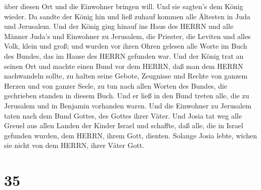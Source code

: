 über diesen Ort und die Einwohner bringen will. Und sie sagten's dem
König wieder.  Da sandte der König hin und ließ zuhauf
kommen alle Ältesten in Juda und Jerusalem.  Und der König
ging hinauf ins Haus des HERRN und alle Männer Juda's und Einwohner zu
Jerusalem, die Priester, die Leviten und alles Volk, klein und groß; und
wurden vor ihren Ohren gelesen alle Worte im Buch des Bundes, das im
Hause des HERRN gefunden war.  Und der König trat an seinen
Ort und machte einen Bund vor dem HERRN, daß man dem HERRN nachwandeln
sollte, zu halten seine Gebote, Zeugnisse und Rechte von ganzem Herzen
und von ganzer Seele, zu tun nach allen Worten des Bundes, die
gechrieben standen in diesem Buch.  Und er ließ in den Bund
treten alle, die zu Jerusalem und in Benjamin vorhanden waren. Und die
Einwohner zu Jerusalem taten nach dem Bund Gottes, des Gottes ihrer
Väter.  Und Josia tat weg alle Greuel aus allen Landen der
Kinder Israel und schaffte, daß alle, die in Israel gefunden wurden, dem
HERRN, ihrem Gott, dienten. Solange Josia lebte, wichen sie nicht von
dem HERRN, ihrer Väter Gott.

\hypertarget{section-34}{%
\section{35}\label{section-34}}

